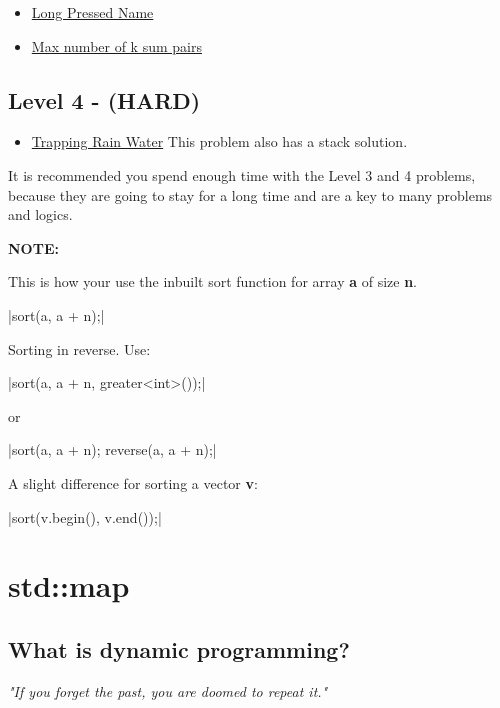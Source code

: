 \documentclass[13pt,oneside,a4paper]{book}
\begin{document}
\begin{itemize}
        \item \href{https://leetcode.com/problems/long-pressed-name/}{Long Pressed Name}
        \item \href{https://leetcode.com/problems/max-number-of-k-sum-pairs/}{Max number of k sum pairs}
\end{itemize}

\section{Level 4 - (HARD)}

\begin{itemize}
        \item \href{https://leetcode.com/problems/trapping-rain-water/}{Trapping Rain Water} This problem also has a stack solution.
\end{itemize}

It is recommended you spend enough time with the Level 3 and 4 problems, because they are going to stay for a long time
and are a key to many problems and logics.

\bigskip

\textbf{NOTE: }\\ 
\smallskip

This is how your use the inbuilt sort function for array \textbf{a} of size \textbf{n}.

|sort(a, a + n);|

\bigskip

Sorting in reverse.
\smallskip
Use:

|sort(a, a + n, greater<int>());|

or

|sort(a, a + n); reverse(a, a + n);|

A slight difference for sorting a vector \textbf{v}:

|sort(v.begin(), v.end());|

\chapter{std::map}

\section{What is dynamic programming?}

\textit{"If you forget the past, you are doomed to repeat it."}
\end{document}
